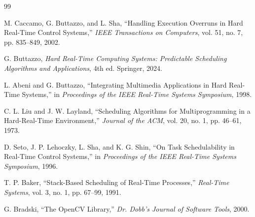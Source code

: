 \documentclass[conference]{IEEEtran}
\begin{document}
\begin{thebibliography}{99}

M. Caccamo, G. Buttazzo, and L. Sha,
``Handling Execution Overruns in Hard Real-Time Control Systems,''
\textit{IEEE Transactions on Computers},
vol. 51, no. 7, pp. 835--849, 2002.

G. Buttazzo,
\textit{Hard Real-Time Computing Systems: Predictable Scheduling Algorithms and Applications},
4th ed. Springer, 2024.

L. Abeni and G. Buttazzo,
``Integrating Multimedia Applications in Hard Real-Time Systems,''
in \textit{Proceedings of the IEEE Real-Time Systems Symposium},
1998.

C. L. Liu and J. W. Layland,
``Scheduling Algorithms for Multiprogramming in a Hard-Real-Time Environment,''
\textit{Journal of the ACM},
vol. 20, no. 1, pp. 46--61, 1973.

D. Seto, J. P. Lehoczky, L. Sha, and K. G. Shin,
``On Task Schedulability in Real-Time Control Systems,''
in \textit{Proceedings of the IEEE Real-Time Systems Symposium},
1996.

T. P. Baker,
``Stack-Based Scheduling of Real-Time Processes,''
\textit{Real-Time Systems},
vol. 3, no. 1, pp. 67--99, 1991.

G. Bradski,
``The OpenCV Library,''
\textit{Dr. Dobb's Journal of Software Tools},
2000.

\end{thebibliography}
\end{document}
